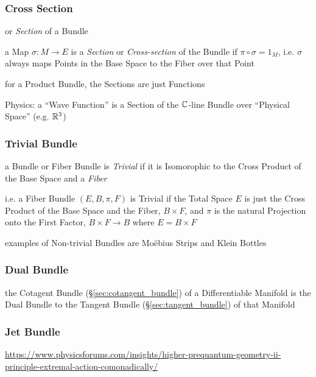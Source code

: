 


\subsubsection{Cross Section}\label{sec:cross_section}

or \emph{Section} of a Bundle

a Map $\sigma : M \rightarrow E$ is a \emph{Section} or \emph{Cross-section} of
the Bundle if $\pi \circ \sigma = 1_M$, i.e. $\sigma$ always maps Points in the
Base Space to the Fiber over that Point

for a Product Bundle, the Sections are just Functions

Physics: a ``Wave Function'' is a Section of the $\mathbb{C}$-line Bundle over
``Physical Space'' (e.g. $\mathbb{R}^3$)



\subsubsection{Trivial Bundle}\label{sec:trivial_bundle}

a Bundle or Fiber Bundle is \emph{Trivial} if it is Isomorophic to the Cross
Product of the Base Space and a \emph{Fiber}

i.e. a Fiber Bundle $(E, B, \pi, F)$ is Trivial if the Total Space $E$ is just
the Cross Product of the Base Space and the Fiber, $B \times F$, and $\pi$ is
the natural Projection onto the First Factor, $B \times F \rightarrow B$ where
$E = B \times F$

examples of Non-trivial Bundles are Mo\"ebius Strips and Klein Bottles



\subsubsection{Dual Bundle}\label{sec:dual_bundle}

the Cotagent Bundle (\S\ref{sec:cotangent_bundle}) of a Differentiable Manifold
is the Dual Bundle to the Tangent Bundle (\S\ref{sec:tangent_bundle}) of that
Manifold



\subsubsection{Jet Bundle}\label{sec:jet_bundle}

\url{https://www.physicsforums.com/insights/higher-prequantum-geometry-ii-principle-extremal-action-comonadically/}

